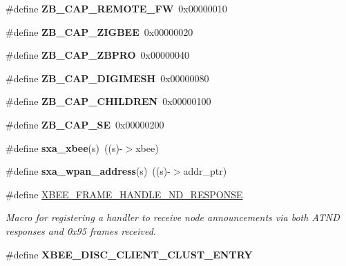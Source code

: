 \begin{DoxyCompactItemize}
\mbox{\label{group___s_x_a_ga7615b11eb71c25970e03e108523c3ded}} 
\#define {\bfseries Z\+B\+\_\+\+C\+A\+P\+\_\+\+R\+E\+M\+O\+T\+E\+\_\+\+FW}~0x00000010
\item 
\mbox{\label{group___s_x_a_ga5293bd87697d34089625bfcc772312be}} 
\#define {\bfseries Z\+B\+\_\+\+C\+A\+P\+\_\+\+Z\+I\+G\+B\+EE}~0x00000020
\item 
\mbox{\label{group___s_x_a_ga32d4e77a012a752e5ea1b736cdcadd10}} 
\#define {\bfseries Z\+B\+\_\+\+C\+A\+P\+\_\+\+Z\+B\+P\+RO}~0x00000040
\item 
\mbox{\label{group___s_x_a_ga00fdeef09968d5bc40cf7200494a09b4}} 
\#define {\bfseries Z\+B\+\_\+\+C\+A\+P\+\_\+\+D\+I\+G\+I\+M\+E\+SH}~0x00000080
\item 
\mbox{\label{group___s_x_a_ga0cced2faadc2f7350d02728629abf0a3}} 
\#define {\bfseries Z\+B\+\_\+\+C\+A\+P\+\_\+\+C\+H\+I\+L\+D\+R\+EN}~0x00000100
\item 
\mbox{\label{group___s_x_a_ga45291623ecceaded53004da1c2293150}} 
\#define {\bfseries Z\+B\+\_\+\+C\+A\+P\+\_\+\+SE}~0x00000200
\item 
\mbox{\label{group___s_x_a_gac382904e58cb18272c185f902e1f527d}} 
\#define {\bfseries sxa\+\_\+xbee}(s)~((s)-\/$>$xbee)
\item 
\mbox{\label{group___s_x_a_ga69ad5cef9cec5623f2c88e37e3af6ce0}} 
\#define {\bfseries sxa\+\_\+wpan\+\_\+address}(s)~((s)-\/$>$addr\+\_\+ptr)
\item 
\#define \hyperlink{group___s_x_a_ga988e2b4c52622034d041f38848881a09}{X\+B\+E\+E\+\_\+\+F\+R\+A\+M\+E\+\_\+\+H\+A\+N\+D\+L\+E\+\_\+\+N\+D\+\_\+\+R\+E\+S\+P\+O\+N\+SE}
\begin{DoxyCompactList}\small\item\em Macro for registering a handler to receive node announcements via both A\+T\+ND responses and 0x95 frames received. \end{DoxyCompactList}\item 
\#define {\bfseries X\+B\+E\+E\+\_\+\+D\+I\+S\+C\+\_\+\+C\+L\+I\+E\+N\+T\+\_\+\+C\+L\+U\+S\+T\+\_\+\+E\+N\+T\+RY}
\item 

\end{DoxyCompactItemize}
